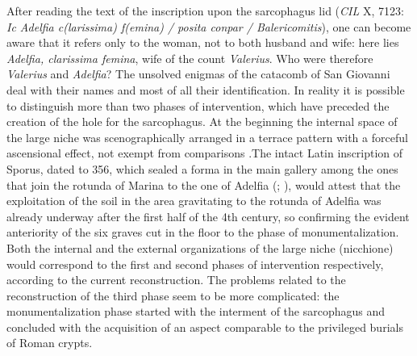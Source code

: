 \documentclass[amsthm,ebook]{saparticle}
\begin{document}
After reading the text of the inscription upon the sarcophagus lid (\emph{CIL} X, 7123: \emph{Ic Adelfia c(larissima) f(emina) / posita conpar / Balericomitis}), one can become aware that it refers only to the woman, not to both husband and wife: here lies \emph{Adelfia, clarissima femina}, wife of the count \emph{Valerius}. Who were therefore \emph{Valerius} and \emph{Adelfia}? The unsolved enigmas of the catacomb of San Giovanni deal with their names and most of all their identification. In reality it is possible to distinguish more than two phases of intervention, which have preceded the creation of the hole for the sarcophagus. At the beginning the internal space of the large niche was scenographically arranged in a terrace pattern with a forceful ascensional effect, not exempt from comparisons \citep[14, plate VII]{NESTORI1973}.The intact Latin inscription of Sporus, dated to 356, which sealed a forma in the main gallery among the ones that join the rotunda of Marina to the one of Adelfia (\citealp[24]{CAVALLARI1872}; \citealp[90]{AGNELLO1953}), would attest that the exploitation of the soil in the area gravitating to the rotunda of Adelfia was already underway after the first half of the 4th century, so confirming the evident anteriority of the six graves cut in the floor to the phase of monumentalization. Both the internal and the external organizations of the large niche (nicchione) would correspond to the first and second phases of intervention respectively, according to the current reconstruction. The problems related to the reconstruction of the third phase seem to be more complicated: the monumentalization phase started with the interment of the sarcophagus and concluded with the acquisition of an aspect comparable to the privileged burials of Roman crypts.
\end{document}
